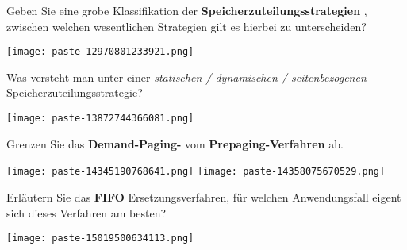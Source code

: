 \documentclass{article}
\begin{document}
\begin{tcolorbox}[colback=white!10!white,colframe=lightgray!75!black,
  savelowerto=\jobname_ex.tex,breakable,enhanced,lines before break=40]

\begin{center}
 Geben Sie eine grobe Klassifikation der 
\textbf{Speicherzuteilungsstrategien
}, zwischen welchen wesentlichen Strategien gilt es hierbei zu unterscheiden? 

\end{center}

\tcblower

\justifying
\texttt{[image: paste-12970801233921.png]}

\end{tcolorbox}
\begin{tcolorbox}[colback=white!10!white,colframe=lightgray!75!black,
  savelowerto=\jobname_ex.tex,breakable,enhanced,lines before break=40]

\begin{center}
 Was versteht man unter einer 
\textit{statischen / dynamischen / seitenbezogenen
}Speicherzuteilungsstrategie? 

\end{center}

\tcblower

\justifying
\texttt{[image: paste-13872744366081.png]}

\end{tcolorbox}
\begin{tcolorbox}[colback=white!10!white,colframe=lightgray!75!black,
  savelowerto=\jobname_ex.tex,breakable,enhanced,lines before break=40]

\begin{center}
 Grenzen Sie das 
\textbf{Demand-Paging-
}vom 
\textbf{Prepaging-Verfahren
}ab. 

\end{center}

\tcblower

\justifying
\texttt{[image: paste-14345190768641.png]}
\texttt{[image: paste-14358075670529.png]}

\end{tcolorbox}
\begin{tcolorbox}[colback=white!10!white,colframe=lightgray!75!black,
  savelowerto=\jobname_ex.tex,breakable,enhanced,lines before break=40]

\begin{center}
 Erläutern Sie das 
\textbf{FIFO
}Ersetzungsverfahren, für welchen Anwendungsfall eigent sich dieses Verfahren am besten? 

\end{center}

\tcblower

\justifying
\texttt{[image: paste-15019500634113.png]}

\end{tcolorbox}
\end{document}
